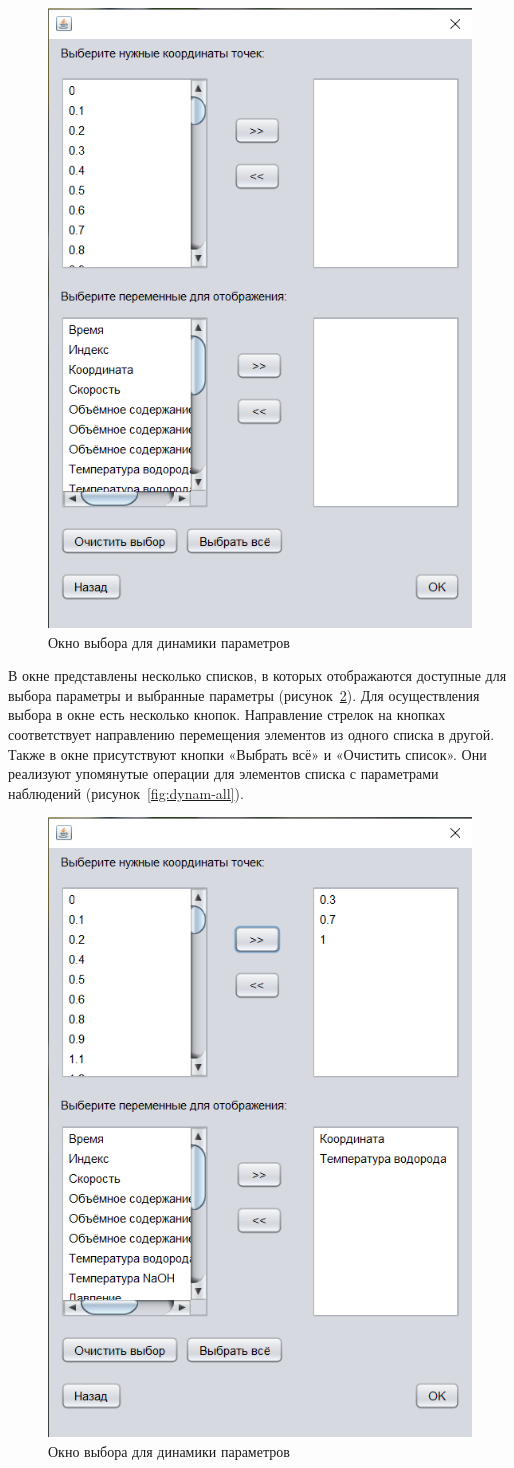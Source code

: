 \begin{figure}[H]
	\centering
	\includegraphics[width=0.5\linewidth]{pics/dynam}
	\caption{Окно выбора для динамики параметров}
	\label{fig:dynam}
\end{figure}

В окне представлены несколько списков, в которых отображаются доступные для выбора параметры и выбранные параметры (рисунок~\ref{fig:dynam-select}). Для осуществления выбора в окне есть несколько кнопок. Направление стрелок на кнопках соответствует направлению перемещения элементов из одного списка в другой. Также в окне присутствуют кнопки «Выбрать всё» и «Очистить список». Они реализуют упомянутые операции для элементов списка с параметрами наблюдений (рисунок~\ref{fig:dynam-all}). 
\begin{figure}[H]
	\centering
	\includegraphics[width=0.5\linewidth]{pics/dynam-select}
	\caption{Окно выбора для динамики параметров}
	\label{fig:dynam-select}
\end{figure}

